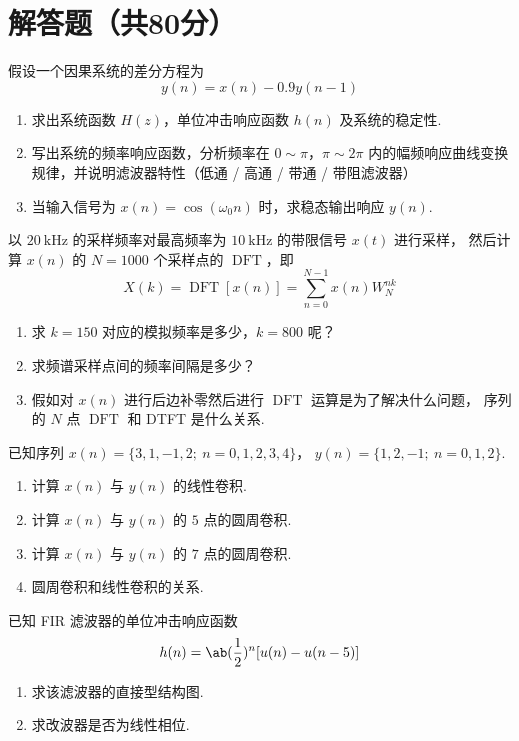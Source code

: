 \documentclass[quiet]{ctexart}
\DeclareMathOperator{\DFT}{DFT}
\begin{document}
\section{解答题（共80分）}

\begin{problem}[12 pt]
  假设一个因果系统的差分方程为
  \[y(n) = x(n) - 0.9y(n - 1)\]
  \begin{enumerate}
    \item 求出系统函数 $H(z)$，单位冲击响应函数 $h(n)$ 及系统的稳定性.
    \item 写出系统的频率响应函数，分析频率在 $0 \sim \pi$，$\pi \sim 2\pi$
    内的幅频响应曲线变换规律，并说明滤波器特性（低通 / 高通 / 带通 / 带阻滤波器）
    \item 当输入信号为 $x(n) = \cos(\omega_0n)$ 时，求稳态输出响应 $y(n)$.
  \end{enumerate}
\end{problem}

\begin{problem}[10 pt]
  以 $\qty{20}\kHz$ 的采样频率对最高频率为 $\qty{10}\kHz$ 的带限信号 $x(t)$ 进行采样，
  然后计算 $x(n)$ 的 $N = 1000$ 个采样点的 $\DFT$，即
  \[X(k) = \DFT[x(n)] = \sum_{n = 0}^{N - 1} x(n) W_N^{nk}\]
  \begin{enumerate}
    \item 求 $k = 150$ 对应的模拟频率是多少，$k = 800$ 呢？
    \item 求频谱采样点间的频率间隔是多少？
    \item 假如对 $x(n)$ 进行后边补零然后进行 $\DFT$ 运算是为了解决什么问题，
    序列的 $N$ 点 $\DFT$ 和 DTFT 是什么关系.
  \end{enumerate}
\end{problem}

\begin{problem}[12 pt]
  已知序列 $x(n) = \{3,1,-1,2;\ n = 0,1,2,3,4\}$，
  $y(n) = \{1,2,-1;\ n = 0,1,2\}$.
  \begin{enumerate}
    \item 计算 $x(n)$ 与 $y(n)$ 的线性卷积.
    \item 计算 $x(n)$ 与 $y(n)$ 的 $5$ 点的圆周卷积.
    \item 计算 $x(n)$ 与 $y(n)$ 的 $7$ 点的圆周卷积.
    \item 圆周卷积和线性卷积的关系.
  \end{enumerate}
\end{problem}

\begin{problem}[10 pt]
  已知 FIR 滤波器的单位冲击响应函数
  \[h(n) = \ab(\frac12)^n [u(n) - u(n - 5)]\]
  \begin{enumerate}
    \item 求该滤波器的直接型结构图.
    \item 求改波器是否为线性相位.
  \end{enumerate}
\end{problem}
\end{document}
